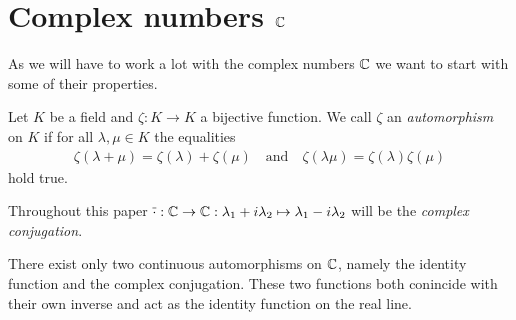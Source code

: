 \section{Complex numbers $\mathbb{C}$}

As we will have to work a lot with the complex numbers $\mathbb{C}$ we want to start with some of their properties.

\begin{definition}
	Let $K$ be a field and $\zeta: K \to K$ a bijective function. We call $\zeta$ an \textit{automorphism} on $K$ if for all $\lambda, \mu \in K$ the equalities
	\begin{align*}
		\zeta(\lambda + \mu) = \zeta(\lambda) + \zeta(\mu) \quad \text{and} \quad \zeta(\lambda \mu) = \zeta(\lambda) \zeta(\mu)
	\end{align*}
	hold true.
\end{definition}


\begin{definition}
	Throughout this paper $\overline{\cdot}: \mathbb{C} \to \mathbb{C}: \lambda_1 + i \lambda_2 \mapsto \lambda_1 - i \lambda_2$ will be the \textit{complex conjugation}.
\end{definition}


\begin{lemma} \label{lemma:continuous_auto}
	There exist only two continuous automorphisms on $\mathbb{C}$, namely the identity function and the complex conjugation. These two functions both conincide with their own inverse and act as the identity function on the real line.
\end{lemma}

